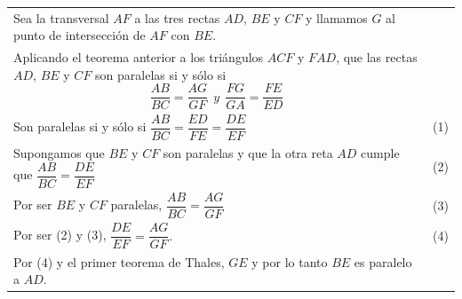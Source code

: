 \documentclass[12pt,a4paper, oneside]{book}
\begin{document}
\begin{tabular}{p{15.9cm} p{1cm}}
Sea la transversal $AF$ a las tres rectas $AD$, $BE$ y $CF$ y llamamos $G$ al punto de intersección de $AF$ con $BE$.
\\Aplicando el teorema anterior a los triángulos $ACF$ y $FAD$, que las rectas $AD$, $BE$ y $CF$ son paralelas si y sólo si
$$\dfrac{AB}{BC}=\dfrac{AG}{GF} \> \>  y \> \> \dfrac{FG}{GA}=\dfrac{FE}{ED}$$
\\Son paralelas si y sólo si $\dfrac{AB}{BC}=\dfrac{ED}{FE}=\dfrac{DE}{EF}$ & (1)
\\Supongamos que $BE$ y $CF$ son paralelas y que la otra reta $AD$ cumple que $\dfrac{AB}{BC}=\dfrac{DE}{EF}$ &(2)
\\ Por ser $BE$ y $CF$ paralelas, $\dfrac{AB}{BC}=\dfrac{AG}{GF}$&(3)
\\Por ser (2) y (3), $\dfrac{DE}{EF}=\dfrac{AG}{GF}.$ & (4)
\\Por (4) y el primer teorema de Thales, $GE$ y por lo tanto $BE$ es paralelo a $AD$. 
\end{tabular}
\end{document}
